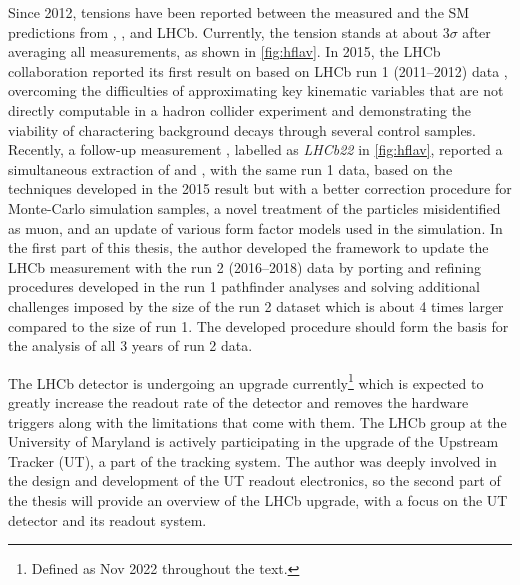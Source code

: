 Since 2012, tensions have been reported between the measured \RDX and the SM
predictions from \babar, \belle, and LHCb.
Currently, the tension stands at about $3 \sigma$ after averaging all
measurements,
as shown in \cref{fig:hflav}.
In 2015, the LHCb collaboration reported its first result on \RDst
based on LHCb run 1 (2011--2012) data
\cite{PhysRevLett.115.111803},
overcoming the difficulties of approximating key kinematic variables
that are not directly computable in a hadron collider experiment
and demonstrating the viability of charactering background decays through
several control samples.
Recently, a follow-up measurement
\cite{RD_RDst_run1_2023},
labelled as \emph{LHCb22} in \cref{fig:hflav},
reported a simultaneous extraction of \RD and \RDst,
with the same run 1 data,
based on the techniques developed in the 2015 result but with
a better correction procedure for Monte-Carlo simulation samples,
a novel treatment of the particles misidentified as muon,
and an update of various form factor models used in the simulation.
In the first part of this thesis,
the author developed the framework to update the LHCb \RDX measurement with the
run 2 (2016--2018) data by porting and refining procedures developed in the run
1 pathfinder analyses and solving additional challenges imposed by the size of
the run 2 dataset which is about 4 times larger compared to the size of run 1.
The developed procedure should form the basis for the analysis of all 3 years
of run 2 data.

The LHCb detector is undergoing an upgrade currently\footnote{
    Defined as Nov 2022 throughout the text.
} which is expected to greatly increase
the readout rate of the detector and removes the hardware triggers along
with the limitations that come with them.
The LHCb group at the University of Maryland is actively participating in the
upgrade of the Upstream Tracker (UT), a part of the tracking system.
The author was deeply involved in the design and development of the UT readout
electronics,
so the second part of the thesis will provide an overview of the LHCb upgrade,
with a focus on the UT detector and its readout system.

